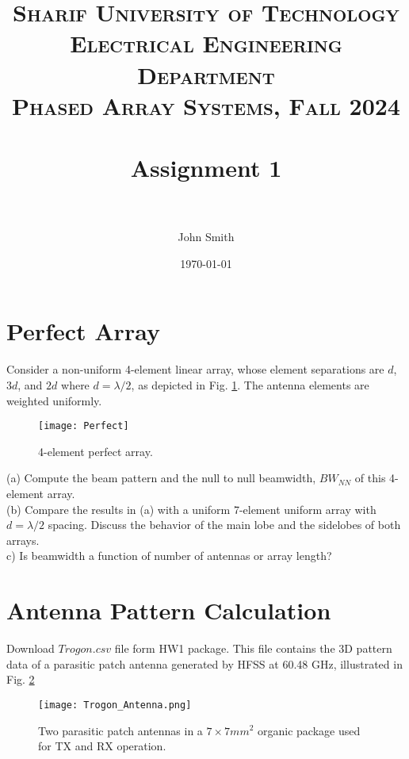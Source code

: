 \documentclass[paper=a4, fontsize=11pt]{scrartcl} %
\title{	
\normalfont \normalsize 
\textsc{\textbf{Sharif University of Technology}\\ Electrical Engineering Department \\Phased Array Systems, Fall 2024} \\ [35pt] %
\horrule{0.5pt} \\[0.4cm] %
\huge Assignment 1  \\ %
\horrule{2pt} \\[0.5cm] %
}
\author{John Smith} %
\date{\normalsize\today} %
\numberwithin{equation}{section} %
\numberwithin{figure}{section} %
\numberwithin{table}{section} %
\begin{document}
\maketitle %

\section{Perfect Array}
Consider a non-uniform 4-element linear array, whose element separations are $d$, $3d$, and $2d$ where $d = \lambda/2$, as depicted in Fig. \ref{perfect}. The antenna elements are weighted uniformly.\\

\begin{figure}
\centering
\texttt{[image: Perfect]}
\caption{4-element perfect array.}
\label{perfect}
\end{figure}
(a) Compute the beam pattern and the null to null beamwidth, $BW_{NN}$ of this 4-element array.\\

(b) Compare the results in (a) with a uniform 7-element uniform array with $d = \lambda/2$  spacing. Discuss the behavior of the main lobe and the sidelobes of both arrays.\\

c) Is beamwidth a function of number of antennas or array length?

\section{Antenna Pattern Calculation}
Download $Trogon.csv$ file form HW1 package. This file contains the 3D pattern data of a parasitic patch antenna generated by HFSS at 60.48 GHz, illustrated in Fig. \ref{Fig2}\\

\begin{figure}[!h]
\centering
\texttt{[image: Trogon\_Antenna.png]}
\caption{Two parasitic patch antennas in a $7\times 7 mm^2$ organic package used for TX and RX operation. }
\label{Fig2}
\end{figure}
\end{document}
